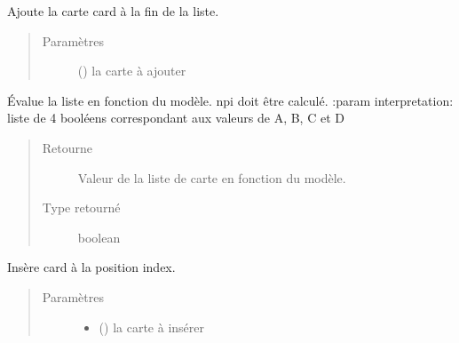 \documentclass[letterpaper,10pt,french]{sphinxmanual}
\begin{document}
\begin{fulllineitems}
\begin{fulllineitems}
\end{fulllineitems}


\begin{fulllineitems}
\label{\detokenize{doc_classe:cards.CardList.append}}
Ajoute la carte card à la  fin de la liste.
\begin{quote}\begin{description}
\item[{Paramètres}] \leavevmode
{} ({\hyperref[\detokenize{doc_classe:cards.Card}]{}}) \textendash{} la carte à ajouter

\end{description}\end{quote}

\end{fulllineitems}


\begin{fulllineitems}
\label{\detokenize{doc_classe:cards.CardList.evalue}}
Évalue la liste en fonction du modèle. npi doit être calculé.
:param interpretation: liste de 4 booléens correspondant aux valeurs de
A, B, C et D
\begin{quote}\begin{description}
\item[{Retourne}] \leavevmode
Valeur de la liste de carte en fonction du modèle.

\item[{Type retourné}] \leavevmode
boolean

\end{description}\end{quote}

\end{fulllineitems}


\begin{fulllineitems}
\label{\detokenize{doc_classe:cards.CardList.insert}}
Insère card à la position index.
\begin{quote}\begin{description}
\item[{Paramètres}] \leavevmode\begin{itemize}
\item {} 
 ({\hyperref[\detokenize{doc_classe:cards.Card}]{}}) \textendash{} la carte à insérer


\end{itemize}
\end{description}
\end{quote}
\end{fulllineitems}
\end{fulllineitems}
\end{document}
